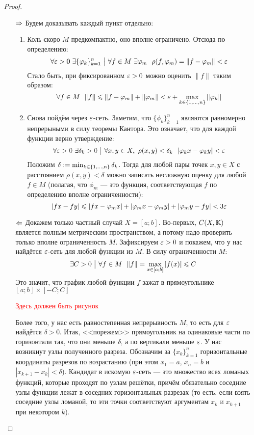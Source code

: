 \begin{proof}~
	\begin{itemize}
		\item[$\Rightarrow$] Будем доказывать каждый пункт отдельно:
		\begin{enumerate}
			\item Коль скоро $M$ предкомпактно, оно вполне ограничено. Отсюда по определению:
			\[
				\forall \varepsilon > 0\ \exists \{\varphi_k\}_{k = 1}^n \ \big|\  \forall f \in M\ \exists \varphi_m\ \ \rho(f, \varphi_m) = \|f - \varphi_m\| < \varepsilon
			\]
			Стало быть, при фиксированном $\varepsilon > 0$ можно оценить $\|f\|$ таким образом:
			\[
				\forall f \in M\ \ \|f\| \leqslant \|f - \varphi_m\| + \|\varphi_m\| < \varepsilon + \max_{k \in \{1, \ldots, n\}} \|\varphi_k\|
			\]
			
			\item Снова пойдём через $\varepsilon$-сеть. Заметим, что $\{\phi_k\}_{k = 1}^n$ являются равномерно непрерыными в силу теоремы Кантора. Это означает, что для каждой функции верно утверждение:
			\[
				\forall \varepsilon > 0\ \exists \delta_k > 0 \ \big|\  \forall x, y \in X,\ \rho(x, y) < \delta_k\ \ |\varphi_kx - \varphi_ky| < \varepsilon
			\]
			Положим $\delta := \min_{k \in \{1, \ldots, n\}} \delta_k$. Тогда для любой пары точек $x, y \in X$ с расстоянием $\rho(x, y) < \delta$ можно записать несложную оценку для любой $f \in M$ (полагая, что $\phi_m$ --- это функция, соответствующая $f$ по определению вполне ограниченности):
			\[
				|fx - fy| \leqslant |fx - \varphi_m x| + |\varphi_m x - \varphi_m y| + |\varphi_m y - fy| < 3\varepsilon
			\]
		\end{enumerate}
		
		\item[$\Leftarrow$] Докажем только частный случай $X = [a; b]$. Во-первых, $C(X, \mathbb{K})$ является полным метрическим пространством, а потому надо проверить только вполне ограниченность $M$. Зафиксируем $\varepsilon > 0$ и покажем, что у нас найдётся $\varepsilon$-сеть для любой функции из $M$. В силу ограниченности $M$:
		\[
			\exists C > 0 \such \forall f \in M\ \ \|f\| = \max_{x \in [a; b]} |f(x)| \le C
		\]
		Это значит, что график любой функции $f$ зажат в прямоугольнике $[a; b] \times [-C; C]$
		
		\textcolor{red}{Здесь должен быть рисунок}
		
		Более того, у нас есть равностепенная непрерывность $M$, то есть для $\varepsilon$ найдётся $\delta > 0$. Итак, <<порежем>> прямоугольник на одинаковые части по горизонтали так, что они меньше $\delta$, а по вертикали меньше $\varepsilon$. У нас возникнут узлы полученного разреза. Обозначим за $\{x_k\}_{k = 1}^n$ горизонтальные координаты разрезов по возрастанию (при этом $x_1 = a$, $x_n = b$ и $|x_{k + 1} - x_k| < \delta$). Кандидат в искомую $\varepsilon$-сеть --- это множество всех ломаных функций, которые проходят по узлам решётки, причём обязательно соседние узлы функции лежат в соседних горизонтальных разрезах (то есть, если взять соседние узлы ломаной, то эти точки соответствуют аргументам $x_k$ и $x_{k + 1}$ при некотором $k$).
		

\end{itemize}
\end{proof}
